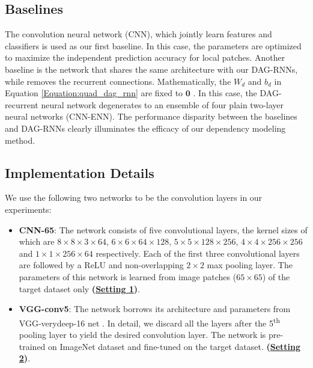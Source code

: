 \documentclass[10pt,twocolumn,letterpaper]{article}
\newcommand \zero {\textbf{0}}
\begin{document}
\subsection{Baselines}
The convolution neural network (CNN), which jointly learn features and classifiers is used as our first baseline. In this case, the parameters are optimized to maximize the independent prediction accuracy for local patches. Another baseline is the network that shares the same architecture with our DAG-RNNs, while removes the recurrent connections. Mathematically, the $W_d$ and $b_d$ in Equation \ref{Equation:quad_dag_rnn} are fixed to $\zero$ . In this case, the DAG-recurrent neural network degenerates to an ensemble of four plain two-layer neural networks (CNN-ENN).
The performance disparity between the baselines and DAG-RNNs clearly illuminates the efficacy of our dependency modeling method.

\subsection{Implementation Details}

We use the following two networks to be the convolution layers in our experiments:
\begin{itemize}
  \item \textbf{CNN-65}: The network consists of five convolutional layers, the kernel sizes of which are $8\times8\times3\times64$, $6\times6\times64\times128$, $5\times 5 \times 128 \times 256$, $4 \times 4 \times 256 \times 256$ and $1 \times 1 \times 256 \times 64 $ respectively. Each of the first three convolutional layers are followed by a ReLU and non-overlapping $2 \times 2$ max pooling layer. The parameters of this network is learned from image patches ($65 \times 65$)
of the target dataset only \textbf{(\underline{Setting 1})}.
  \item \textbf{VGG-conv5}: The network borrows its architecture and parameters from VGG-verydeep-16 net \cite{simonyan2014very}. In detail, we discard all the layers after the 5\textsuperscript{th} pooling layer to yield the desired convolution layer. The network is pre-trained on ImageNet dataset and fine-tuned on the target dataset. \cite{deng2009imagenet}
      \textbf{(\underline{Setting 2})}.
\end{itemize}
\end{document}
